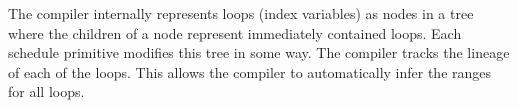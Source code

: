 The compiler internally represents loops (index variables) 
as nodes in a tree where the children
of a node represent immediately contained loops. Each schedule 
primitive modifies this tree in some way. The compiler tracks 
the lineage of each of the loops. This allows the compiler to 
automatically infer the ranges for all loops.


